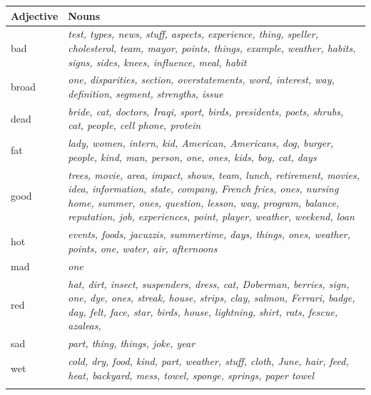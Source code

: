 \documentclass[output=paper]{langscibook}
\begin{document}
\begin{tabularx}{\textwidth}{lQ}

\lsptoprule
Adjective & Nouns\\\midrule
bad & \textit{test, types, news, stuff, aspects, experience, thing, speller, cholesterol, team, mayor, points, things, example, weather, habits, signs, sides, knees, influence, meal, habit}\\
broad & \textit{one, disparities, section, overstatements, word, interest, way, definition, segment, strengths, issue}\\
dead & \textit{bride, cat, doctors, Iraqi, sport, birds, presidents, poets, shrubs, cat, people, cell phone, protein}\\
fat & \textit{lady, women, intern, kid, American, Americans, dog, burger, people, kind, man, person, one, ones, kids, boy, cat, days}\\
good & \textit{trees, movie, area, impact, shows, team, lunch, retirement, movies, idea, information, state, company, French fries, ones, nursing home, summer, ones, question, lesson, way, program, balance, reputation, job, experiences, point, player, weather, weekend, loan}\\
hot & \textit{events, foods, jacuzzis, summertime, days, things, ones, weather, points, one, water, air, afternoons}\\
mad & \textit{one}\\
red & \textit{hat, dirt, insect, suspenders, dress, cat, Doberman, berries, sign, one, dye, ones, streak, house, strips, clay, salmon, Ferrari, badge, day, felt, face, star, birds, house, lightning, shirt, rats, fescue, azaleas,} \\
sad & \textit{part, thing, things, joke, year} \\
wet & \textit{cold, dry, food, kind, part, weather, stuff, cloth, June, hair, feed, heat, backyard, mess, towel, sponge, springs, paper towel}\\
\lspbottomrule
\end{tabularx}

{\sloppy\printbibliography[heading=subbibliography,notkeyword=this]}
\end{document}
